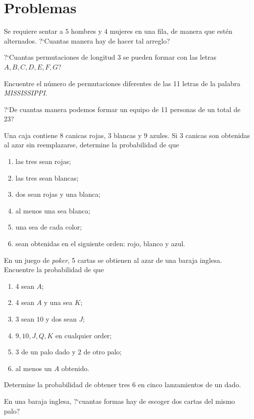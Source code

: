 \section*{Problemas}
{}
\begin{problema}
	\label{solved:1.22}
	Se requiere sentar a $5$ hombres y $4$ mujeres en una fila, de manera que estén alternados. ?`Cuantas manera hay de hacer tal arreglo?
\end{problema}


{}
\begin{problema}
	\label{exmp:1.16}
	?`Cuantas permutaciones de longitud 3 se pueden formar con las letras $A,B,C,D,E,F,G$?
\end{problema}


{}
\begin{problema}
	\label{exmp:1.17}
	Encuentre el número de permutaciones diferentes de las 11 letras de la palabra \emph{MISSISSIPPI}.
\end{problema}

\begin{problema}
	\label{solved:1.29}
	?`De cuantas manera podemos formar un equipo de 11 personas de un total de 23?
\end{problema}

{}
\begin{problema}
	\label{solved:1.35}
	Una caja contiene $8$ canicas rojas, $3$ blancas y $9$ azules. Si 3 canicas son obtenidas al azar sin reemplazarse, determine la probabilidad de que
	\begin{enumerate}
		\item las tres sean rojas; 
		\item las tres sean blancas; 
		\item dos sean rojas y una blanca; 
		\item al menos una sea blanca; 
		\item una sea de cada color; 
		\item sean obtenidas en el siguiente orden: rojo, blanco y azul.
	\end{enumerate}
	
\end{problema}

{}
\begin{problema}
	\label{solved:1.36}
	En un juego de \emph{poker}, 5 cartas se obtienen al azar de una baraja inglesa. Encuentre la probabilidad de que
	\begin{enumerate}
		\item 4 sean $A$; 
		\item 4 sean $A$ y una sea $K$; 
		\item 3 sean $10$ y dos sean $J$; 
		\item $9,10,J,Q,K$ en cualquier order; 
		\item 3 de un palo dado y 2 de otro palo; 
		\item al menos un $A$ obtenido.
	\end{enumerate}
	
\end{problema}

{}
\begin{problema}
	\label{solved:1.37}
	Determine la probabilidad de obtener tres $6$ en cinco lanzamientos de un dado.
\end{problema}

\begin{problema}
	\label{exmp:1.18}
	En una baraja inglesa, ?`cuantas formas hay de escoger dos cartas del mismo palo?
\end{problema}
